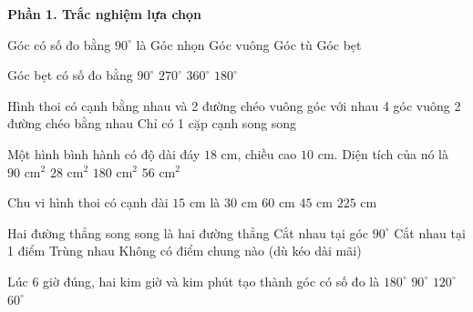 \textbf{Phần 1. Trắc nghiệm lựa chọn}

\begin{ex} %
Góc có số đo bằng $90^\circ$ là
\choice
{Góc nhọn}
{\True Góc vuông}
{Góc tù}
{Góc bẹt}
\end{ex}

\begin{ex} %
Góc bẹt có số đo bằng
\choice
{$90^\circ$}
{$270^\circ$}
{$360^\circ$}
{\True $180^\circ$}
\end{ex}

\begin{ex} %
Hình thoi có
\choice
{ cạnh bằng nhau và 2 đường chéo vuông góc với nhau}
{4 góc vuông}
{2 đường chéo bằng nhau}
{Chỉ có 1 cặp cạnh song song}
\end{ex}

\begin{ex} %
Một hình bình hành có độ dài đáy $18\text{ cm}$, chiều cao $10\text{ cm}$. Diện tích của nó là
\choice
{$90\text{ cm}^2$}
{$28\text{ cm}^2$}
{\True $180\text{ cm}^2$}
{$56\text{ cm}^2$}
\end{ex}

\begin{ex} %
Chu vi hình thoi có cạnh dài $15\text{ cm}$ là
\choice
{$30\text{ cm}$}
{\True $60\text{ cm}$}
{$45\text{ cm}$}
{$225\text{ cm}$}
\end{ex}

\begin{ex} %
Hai đường thẳng song song là hai đường thẳng
\choice
{Cắt nhau tại góc $90^\circ$}
{Cắt nhau tại 1 điểm}
{Trùng nhau}
{\True Không có điểm chung nào (dù kéo dài mãi)}
\end{ex}

\begin{ex} %
Lúc 6 giờ đúng, hai kim giờ và kim phút tạo thành góc có số đo là
\choice
{\True $180^\circ$}
{$90^\circ$}
{$120^\circ$}
{$60^\circ$}
\end{ex}

